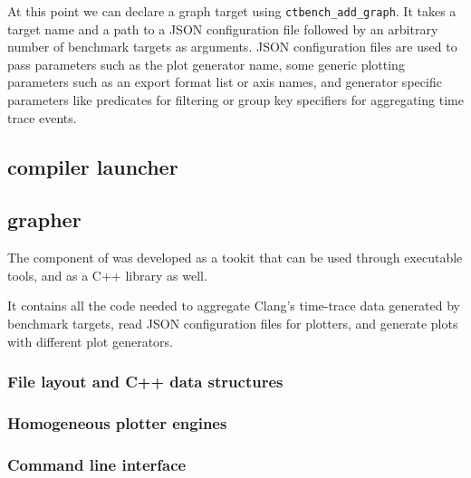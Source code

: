 \documentclass[../../main.tex]{subfiles}
\begin{document}
At this point we can declare a graph target using \lstinline{ctbench_add_graph}.
It takes a target name and a path to a JSON configuration file followed by an
arbitrary number of benchmark targets as arguments. JSON configuration files are
used to pass parameters such as the plot generator name, some generic plotting
parameters such as an export format list or axis names, and generator specific
parameters like predicates for filtering or group key specifiers for aggregating
time trace events.

\subsection{compiler launcher}





\subsection{grapher}

The \grapher component of \ctbench was developed as a tookit that can be used
through executable tools, and as a C++ library as well.

It contains all the code needed to aggregate Clang's time-trace data generated
by \ctbench benchmark targets, read JSON configuration files for plotters, and
generate plots with different plot generators.

\subsubsection{File layout and C++ data structures}


\subsubsection{Homogeneous plotter engines}



\subsubsection{Command line interface}
\end{document}
